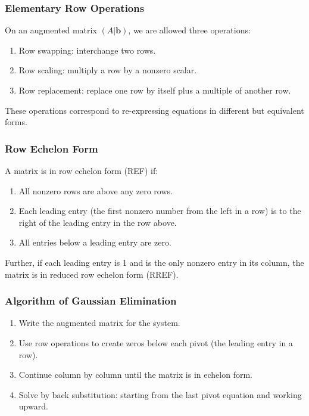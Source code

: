 \documentclass[
  12pt,
  a4paper,
]{article}
\begin{document}
\subsubsection{Elementary Row
Operations}\label{elementary-row-operations}

On an augmented matrix \((A|\mathbf{b})\), we are allowed three
operations:

\begin{enumerate}
\def\labelenumi{\arabic{enumi}.}
\item
  Row swapping: interchange two rows.
\item
  Row scaling: multiply a row by a nonzero scalar.
\item
  Row replacement: replace one row by itself plus a multiple of another
  row.
\end{enumerate}

These operations correspond to re-expressing equations in different but
equivalent forms.

\subsubsection{Row Echelon Form}\label{row-echelon-form}

A matrix is in row echelon form (REF) if:

\begin{enumerate}
\def\labelenumi{\arabic{enumi}.}
\item
  All nonzero rows are above any zero rows.
\item
  Each leading entry (the first nonzero number from the left in a row)
  is to the right of the leading entry in the row above.
\item
  All entries below a leading entry are zero.
\end{enumerate}

Further, if each leading entry is 1 and is the only nonzero entry in its
column, the matrix is in reduced row echelon form (RREF).

\subsubsection{Algorithm of Gaussian
Elimination}\label{algorithm-of-gaussian-elimination}

\begin{enumerate}
\def\labelenumi{\arabic{enumi}.}
\item
  Write the augmented matrix for the system.
\item
  Use row operations to create zeros below each pivot (the leading entry
  in a row).
\item
  Continue column by column until the matrix is in echelon form.
\item
  Solve by back substitution: starting from the last pivot equation and
  working upward.
\end{enumerate}
\end{document}
